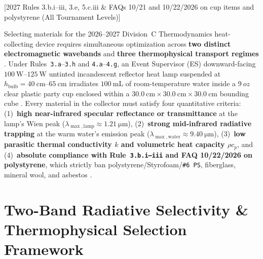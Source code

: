 [2027 Rules 3.b.i--iii, 3.e, 5.c.iii \& FAQs 10/21 and 10/22/2026 on cup items and polystyrene (All Tournament Levels)]

Selecting materials for the 2026--2027 Division~C Thermodynamics heat-collecting device requires simultaneous optimization across \textbf{two distinct electromagnetic wavebands} and \textbf{three thermophysical transport regimes} . Under Rules~\texttt{3.a}--\texttt{3.h} and \texttt{4.a}--\texttt{4.g}, an Event Supervisor (ES) downward-facing $\SIrange{100}{125}{\watt}$ untinted incandescent reflector heat lamp suspended at $h_{\mathrm{bulb}} = \SIrange{40}{65}{\centi\meter}$ irradiates $\SI{100}{\milli\liter}$ of room-temperature water inside a $\SI{9}{oz}$ clear plastic party cup enclosed within a $\SI{30.0}{\centi\meter} \times \SI{30.0}{\centi\meter} \times \SI{30.0}{\centi\meter}$ bounding cube . Every material in the collector must satisfy four quantitative criteria: (1)~\textbf{high near-infrared specular reflectance or transmittance} at the lamp's Wien peak ($\lambda_{\max,\mathrm{lamp}} \approx \SI{1.21}{\micro\meter}$), (2)~\textbf{strong mid-infrared radiative trapping} at the warm water's emission peak ($\lambda_{\max,\mathrm{water}} \approx \SI{9.40}{\micro\meter}$), (3)~\textbf{low parasitic thermal conductivity $k$ and volumetric heat capacity $\rho c_p$}, and (4)~\textbf{absolute compliance with Rule~\texttt{3.b.i--iii} and FAQ 10/22/2026 on polystyrene}, which strictly ban polystyrene/Styrofoam/\texttt{\#6~PS}, fiberglass, mineral wool, and asbestos .

\section{Two-Band Radiative Selectivity \& Thermophysical Selection Framework}\label{sec:14.1}

